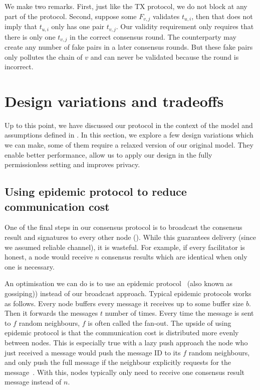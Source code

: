 We make two remarks.
First, just like the TX protocol, we do not block at any part of the protocol.
Second, suppose some $F_{v, j}$ validates $t_{u, i}$, then that does not imply that $t_{u, i}$ only has one pair $t_{v, j}$.
Our validity requirement only requires that there is only one $t_{v, j}$ in the correct consensus round.
The counterparty may create any number of fake pairs in a later consensus rounds.
But these fake pairs only pollutes the chain of $v$ and can never be validated because the round is incorrect.

\section{Design variations and tradeoffs}
\label{sec:tradeoffs}

Up to this point,
we have discussed our protocol in the context of the model and assumptions defined in .
In this section, 
we explore a few design variations which we can make, some of them require a relaxed version of our original model.
They enable better performance, allow us to apply our design in the fully permissionless setting and improves privacy.

\subsection{Using epidemic protocol to reduce communication cost}
One of the final steps in our consensus protocol is to broadcast the consensus result and signatures to every other node ().
While this guarantees delivery (since we assumed reliable channel), it is wasteful.
For example, if every facilitator is honest, a node would receive $n$ consensus results which are identical when only one is necessary.

An optimisation we can do is to use an epidemic protocol~\cite{eugster2004epidemic} (also known as gossiping)) instead of our broadcast approach.
Typical epidemic protocols works as follows.
Every node buffers every message it receives up to some buffer size $b$.
Then it forwards the messages $t$ number of times.
Every time the message is sent to $f$ random neighbours, $f$ is often called the fan-out.
The upside of using epidemic protocol is that the communication cost is distributed more evenly between nodes.
This is especially true with a lazy push approach the node who just received a message would push the message ID to its $f$ random neighbours,
and only push the full message if the neighbour explicitly requests for the message~\cite{leitao2007epidemic}.
With this, nodes typically only need to receive one consensus result message instead of $n$.


